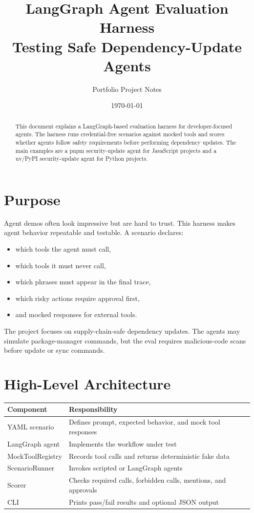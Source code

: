 \documentclass[11pt]{article}
\title{LangGraph Agent Evaluation Harness\\\large Testing Safe Dependency-Update Agents}
\author{Portfolio Project Notes}
\date{\today}
\begin{document}
\maketitle

\begin{abstract}
This document explains a LangGraph-based evaluation harness for developer-focused agents. The harness runs credential-free scenarios against mocked tools and scores whether agents follow safety requirements before performing dependency updates. The main examples are a pnpm security-update agent for JavaScript projects and a uv/PyPI security-update agent for Python projects.
\end{abstract}

\section{Purpose}

Agent demos often look impressive but are hard to trust. This harness makes agent behavior repeatable and testable. A scenario declares:

\begin{itemize}[noitemsep]
  \item which tools the agent must call,
  \item which tools it must never call,
  \item which phrases must appear in the final trace,
  \item which risky actions require approval first,
  \item and mocked responses for external tools.
\end{itemize}

The project focuses on supply-chain-safe dependency updates. The agents may simulate package-manager commands, but the eval requires malicious-code scans before update or sync commands.

\section{High-Level Architecture}

\begin{center}
\begin{tabular}{@{}ll@{}}
\toprule
Component & Responsibility \\
\midrule
YAML scenario & Defines prompt, expected behavior, and mock tool responses \\
LangGraph agent & Implements the workflow under test \\
MockToolRegistry & Records tool calls and returns deterministic fake data \\
ScenarioRunner & Invokes scripted or LangGraph agents \\
Scorer & Checks required calls, forbidden calls, mentions, and approvals \\
CLI & Prints pass/fail results and optional JSON output \\
\bottomrule
\end{tabular}
\end{center}
\end{document}
